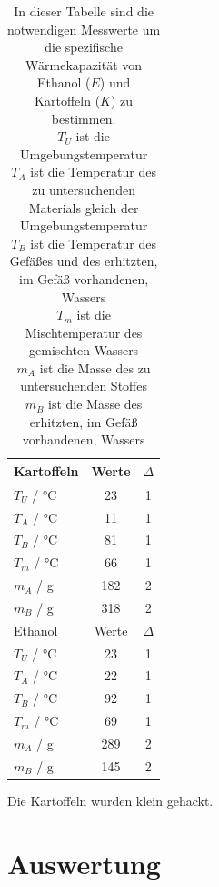 \documentclass[11pt, ngerman]{scrartcl}
\begin{document}
\begin{table}[H]
	\centering
	\caption{In dieser Tabelle sind die notwendigen Messwerte um die
		spezifische Wärmekapazität von Ethanol ($E$) und Kartoffeln ($K$) zu bestimmen. \\
		$T_U$ ist die Umgebungstemperatur \\
		$T_A$ ist die Temperatur des zu untersuchenden Materials gleich der Umgebungstemperatur \\
		$T_B$ ist die Temperatur des Gefäßes und des erhitzten, im Gefäß vorhandenen, Wassers \\
		$T_m$ ist die Mischtemperatur des gemischten Wassers \\
		$m_A$ ist die Masse des zu untersuchenden Stoffes \\
		$m_B$ ist die Masse des erhitzten, im Gefäß vorhandenen, Wassers \\
	}
	\label{tab:messwerte_stoffe}
	\begin{tabular}{l|S|S}
		Kartoffeln             & {Werte} & {$\Delta$} \\ \hline
		$T_U$ / \si{\celsius}  & 23      & 1          \\
		$T_A$ / \si{\celsius}  & 11      & 1          \\
		$T_B$ / \si{\celsius}  & 81      & 1          \\
		$T_m$ / \si{\celsius}  & 66      & 1          \\
		$m_A$ / \si{\g}        & 182     & 2          \\
		$m_B$ / \si{\g}        & 318     & 2          \\ \hline \hline
		Ethanol                & {Werte} & {$\Delta$} \\ \hline
		$T_U$  / \si{\celsius} & 23      & 1          \\
		$T_A$  / \si{\celsius} & 22      & 1          \\
		$T_B$  / \si{\celsius} & 92      & 1          \\
		$T_m$  / \si{\celsius} & 69      & 1          \\
		$m_A$  / \si{\g}       & 289     & 2          \\
		$m_B$  / \si{\g}       & 145     & 2          \\ \hline
	\end{tabular}
\end{table}

Die Kartoffeln wurden klein gehackt.

\section{Auswertung}
\label{sec:auswertung}
\end{document}
